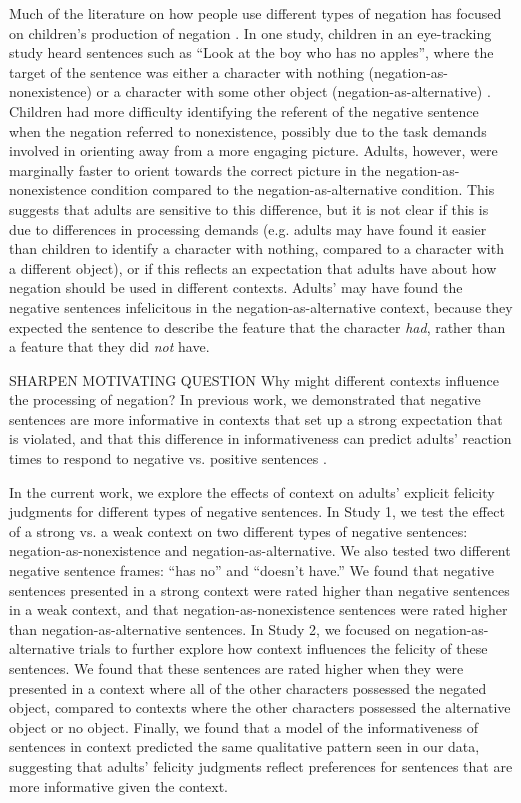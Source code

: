 \documentclass[10pt,letterpaper]{article}
\begin{document}
Much of the literature on how people use different types of negation has focused on children's production of negation \cite{bloom1970, pea1980, choi1988}.  In one study, children in an eye-tracking study heard sentences such as ``Look at the boy who has no apples'', where the target of the sentence was either a character with nothing (negation-as-nonexistence) or a character with some other object (negation-as-alternative) \cite{nordmeyer2013, nordmeyer2014b}.  Children had more difficulty identifying the referent of the negative sentence when the negation referred to nonexistence, possibly due to the task demands involved in orienting away from a more engaging picture.  Adults, however, were marginally faster to orient towards the correct picture in the negation-as-nonexistence condition compared to the negation-as-alternative condition.  This suggests that adults are sensitive to this difference, but it is not clear if this is due to differences in processing demands (e.g. adults may have found it easier than children to identify a character with nothing, compared to a character with a different object), or if this reflects an expectation that adults have about how negation should be used in different contexts.  Adults' may have found the negative sentences infelicitous in the negation-as-alternative context, because they expected the sentence to describe the feature that the character \emph{had}, rather than a feature that they did \emph{not} have.


SHARPEN MOTIVATING QUESTION Why might different contexts influence the processing of negation?  In previous work, we demonstrated that negative sentences are more informative in contexts that set up a strong expectation that is violated, and that this difference in informativeness can predict adults' reaction times to respond to negative vs. positive sentences \cite{nordmeyer2014}.  

In the current work, we explore the effects of context on adults' explicit felicity judgments for different types of negative sentences.  In Study 1, we test the effect of a strong vs. a weak context on two different types of negative sentences: negation-as-nonexistence and negation-as-alternative.  We also tested two different negative sentence frames: ``has no'' and ``doesn't have.''  We found that negative sentences presented in a strong context were rated higher than negative sentences in a weak context, and that negation-as-nonexistence sentences were rated higher than negation-as-alternative sentences.  In Study 2, we focused on negation-as-alternative trials to further explore how context influences the felicity of these sentences.  We found that these sentences are rated higher when they were presented in a context where all of the other characters possessed the negated object, compared to contexts where the other characters possessed the alternative object or no object.  Finally, we found that a model of the informativeness of sentences in context predicted the same qualitative pattern seen in our data, suggesting that adults' felicity judgments reflect preferences for sentences that are more informative given the context.
\end{document}
